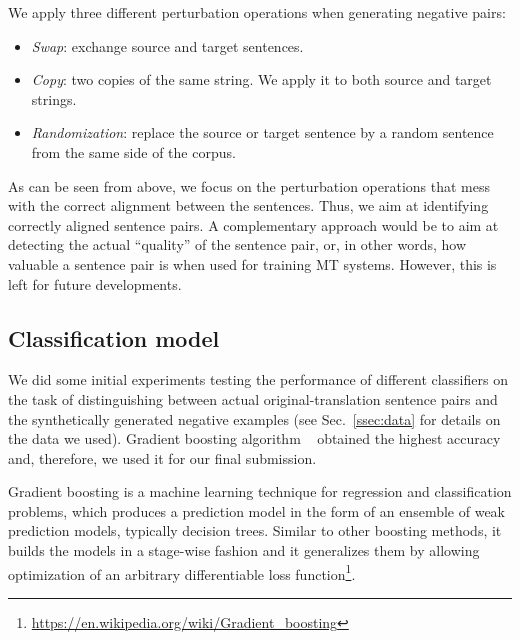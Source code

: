 We apply three different perturbation operations when generating negative pairs:
\begin{itemize}
\item \textit{Swap}: exchange source and target sentences.
\item \textit{Copy}: two copies of the same string. We apply it to both source and target strings.
\item \textit{Randomization}: replace the source or target sentence by a random sentence from the same side of the corpus.
\end{itemize}

As can be seen from above, we focus on the perturbation operations that mess with the correct alignment between the sentences. Thus, we aim at identifying correctly aligned sentence pairs. A complementary approach would be to aim at detecting the actual ``quality'' of the sentence pair, or, in other words, how valuable a sentence pair is when used for training MT systems. However, this is left for future developments.


\subsection{Classification model}
\label{ssec:model}

We did some initial experiments testing the performance of different classifiers on the task of distinguishing between actual original-translation sentence pairs and the synthetically generated negative examples (see Sec.~\ref{ssec:data} for details on the data we used). Gradient boosting algorithm ~\cite{Friedman02} obtained the highest accuracy and, therefore, we used it for our final submission.

Gradient boosting is a machine learning technique for regression and classification problems, which produces a prediction model in the form of an ensemble of weak prediction models, typically decision trees. Similar to other boosting methods, it builds the models in a stage-wise fashion and it generalizes them by allowing optimization of an arbitrary differentiable loss function\footnote{\url{https://en.wikipedia.org/wiki/Gradient_boosting}}.
